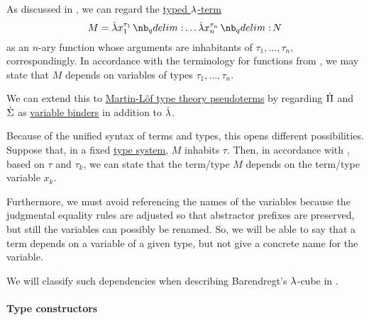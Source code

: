 \begin{remark}\label{rem:mltt_pseudoterm_dependency}
  As discussed in , we can regard the \hyperref[def:typed_lambda_term]{typed \( {\mathrm \lambda} \)-term}
  \begin{equation*}
    M = \qabs {x_1^{\tau_1}}\ldots \qabs {x_n^{\tau_n}} N
  \end{equation*}
  as an \( n \)-ary function whose arguments are inhabitants of \( \tau_1, \ldots, \tau_n \), correspondingly. In accordance with the terminology for functions from , we may state that \( M \) depends on variables of types \( \tau_1, \ldots, \tau_n \).

  We can extend this to \hyperref[rem:pseudoterm_schemas]{Martin-L\"of type theory pseudoterms} by regarding \( \dot{\Pi} \) and \( \dot{\Sigma} \) as \hyperref[con:variable_binding]{variable binders} in addition to \( \dot{{\mathrm \lambda}} \).

  Because of the unified syntax of terms and types, this opens different possibilities. Suppose that, in a fixed \hyperref[def:abstract_type_system]{type system}, \( M \) inhabits \( \tau \). Then, in accordance with , based on \( \tau \) and \( \tau_k \), we can state that the term/type \( M \) depends on the term/type variable \( x_k \).

  Furthermore, we must avoid referencing the names of the variables because the judgmental equality rules are adjusted so that abstractor prefixes are preserved, but still the variables can possibly be renamed. So, we will be able to say that a term depends on a variable of a given type, but not give a concrete name for the variable.

  We will classify such dependencies when describing Barendregt's \( {\mathrm \lambda} \)-cube in .
\end{remark}

\paragraph{Type constructors}

